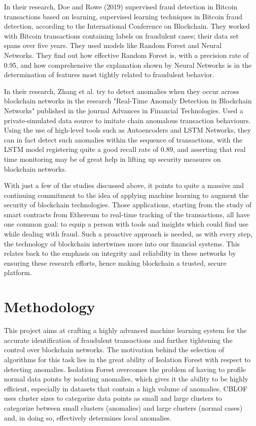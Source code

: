 \documentclass[journal]{IEEEtran}
\begin{document}
In their research, Doe and Rowe (2019) supervised fraud detection in Bitcoin transactions based on learning, supervised learning techniques in Bitcoin fraud detection, according to the International Conference on Blockchain. They worked with Bitcoin transactions containing labels on fraudulent cases; their data set spans over five years. They used models like Random Forest and Neural Networks. They find out how effective Random Forest is, with a precision rate of 0.95, and how comprehensive the explanation shown by Neural Networks is in the determination of features most tightly related to fraudulent behavior.

In their research, Zhang et al. try to detect anomalies when they occur across blockchain networks in the research "Real-Time Anomaly Detection in Blockchain Networks" published in the journal Advances in Financial Technologies. Used a private-simulated data source to imitate chain anomalous transaction behaviours. Using the use of high-level tools such as Autoencoders and LSTM Networks, they can in fact detect such anomalies within the sequence of transactions, with the LSTM model registering quite a good recall rate of 0.89, and asserting that real time monitoring may be of great help in lifting up security measures on blockchain networks.

With just a few of the studies discussed above, it points to quite a massive and continuing commitment to the idea of applying machine learning to augment the security of blockchain technologies. Those applications, starting from the study of smart contracts from Ethereum to real-time tracking of the transactions, all have one common goal: to equip a person with tools and insights which could find use while dealing with fraud. Such a proactive approach is needed, as with every step, the technology of blockchain intertwines more into our financial systems. This relates back to the emphasis on integrity and reliability in these networks by ensuring these research efforts, hence making blockchain a trusted, secure platform.

\section{Methodology}

This project aims at crafting a highly advanced machine learning system for the accurate identification of fraudulent transactions and further tightening the control over blockchain networks. The motivation behind the selection of algorithms for this task lies in the great ability of Isolation Forest with respect to detecting anomalies. Isolation Forest overcomes the problem of having to profile normal data points by isolating anomalies, which gives it the ability to be highly efficient, especially in datasets that contain a high volume of anomalies. CBLOF uses cluster sizes to categorize data points as small and large clusters to categorize between small clusters (anomalies) and large clusters (normal cases) and, in doing so, effectively determines local anomalies.
\end{document}
